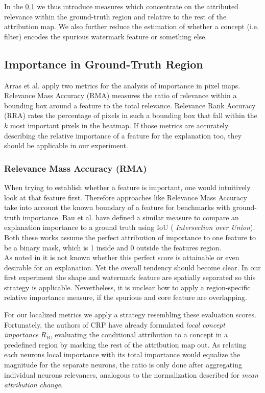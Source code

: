 In the \cref{section:region_specific} we thus introduce measures which concentrate on the attributed relevance within the ground-truth region and relative to the rest of the attribution map.
We also further reduce the estimation of whether a concept (i.e. filter) encodes the spurious watermark feature or something else. 

\subsection{Importance in Ground-Truth Region}\label{section:region_specific}

Arras et al. \cite{Arras2022} apply two metrics for the analysis of importance in pixel maps. Relevance Mass Accuracy (RMA) measures the ratio of relevance within a bounding box around a feature to the total relevance. Relevance Rank Accuracy (RRA) rates the percentage of pixels in such a bounding box that fall within the $k$ most important pixels in the heatmap. If those metrics are accurately describing the relative importance of a feature for the explanation too, they should be applicable in our experiment. 

\subsubsection{Relevance Mass Accuracy (RMA)}
When trying to establish whether a feature is important, one would intuitively look at that feature first. Therefore approaches like Relevance Mass Accuracy take into account the known boundary of a feature for benchmarks with ground-truth importance.
Bau et al. \cite{Bau2017, Bau2020} have defined a similar measure to compare an explanation importance to a ground truth using IoU ( \textit{Intersection over Union}). Both these works assume the perfect attribution of importance to one feature to be a binary mask, which is 1 inside and 0 outside the features region. \\
As noted in \cite{Arras2022} it is not known whether this perfect score is attainable or even desirable for an explanation. Yet the overall tendency should become clear. 
In our first experiment the shape and watermark feature are spatially separated so this strategy is applicable. Nevertheless, it is unclear how to apply a region-specific relative importance measure, if the spurious and core feature are overlapping. 

For our localized metrics we apply a strategy resembling these evaluation scores. 
Fortunately, the authors of CRP have already formulated \textit{local concept importance} $R_B$, evaluating the conditional attribution to a concept in a predefined region by masking the rest of the attribution map out. As relating each neurons local importance with its total importance would equalize the magnitude for the separate neurons, the ratio is only done after aggregating individual neurons relevances, analogous to the normalization described for \textit{mean attribution change}. 


